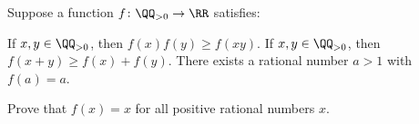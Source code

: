 Suppose a function $f \colon \QQ_{>0} \to \RR$ satisfies:
\begin{enumerate}
  \ii [(i)] If $x,y \in \QQ_{>0}$, then $f(x)f(y) \ge f(xy)$.
  \ii [(ii)] If $x,y \in \QQ_{>0}$, then $f(x+y) \ge f(x) + f(y)$.
  \ii [(iii)] There exists a rational number $a > 1$ with $f(a) = a$.
\end{enumerate}
Prove that $f(x) = x$ for all positive rational numbers $x$.